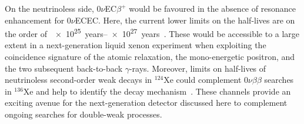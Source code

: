 On the neutrinoless side, $0\nu$EC$\beta^+$ would be favoured in the absence of resonance enhancement for $0\nu$ECEC. Here, the current lower limits on the half-lives are on the order of~\SIrange{e25}{e27}{years}~\cite{Barea:2013wga, Kim:1982vi, Doi:1992dm, Hirsch:1994es, Suhonen:2003gx, Rath:2009dr, Wittweg:2020fak}. These would be accessible to a large extent in a next-generation liquid xenon experiment when exploiting the coincidence signature of the atomic relaxation, the mono-energetic positron, and the two subsequent back-to-back $\gamma$-rays. Moreover, limits on half-lives of neutrinoless second-order weak decays in $^{124}$Xe could complement $0\nu\beta\beta$ searches in $^{136}$Xe and help to identify the decay mechanism~\cite{Hirsch:1994es, Wittweg:2020fak}. These channels provide an exciting avenue for the next-generation detector discussed here to complement ongoing searches for double-weak processes.




